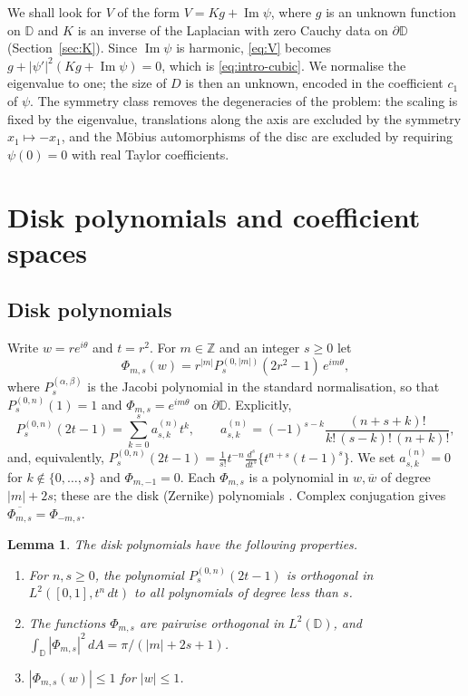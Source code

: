 \documentclass[11pt]{amsart}
\newtheorem{lemma}[theorem]{Lemma}
\theoremstyle{definition}
\theoremstyle{remark}
\numberwithin{equation}{section}
\newcommand{\Z}{\mathbb{Z}}
\newcommand{\D}{\mathbb{D}}
\newcommand{\bw}{\overline{w}}
\DeclareMathOperator{\im}{Im}
\begin{document}
We shall look for $V$ of the form $V=Kg+\im\psi$, where $g$ is an unknown function on $\D$ and $K$ is an inverse of the Laplacian with zero Cauchy data on $\partial\D$ (Section~\ref{sec:K}). Since $\im\psi$ is harmonic, \eqref{eq:V} becomes $g+|\psi'|^2(Kg+\im\psi)=0$, which is \eqref{eq:intro-cubic}. We normalise the eigenvalue to one; the size of $D$ is then an unknown, encoded in the coefficient $c_1$ of $\psi$. The symmetry class removes the degeneracies of the problem: the scaling is fixed by the eigenvalue, translations along the axis are excluded by the symmetry $x_1\mapsto-x_1$, and the M\"obius automorphisms of the disc are excluded by requiring $\psi(0)=0$ with real Taylor coefficients.

\section{Disk polynomials and coefficient spaces}\label{sec:disk}

\subsection{Disk polynomials}
Write $w=re^{i\theta}$ and $t=r^2$. For $m\in\Z$ and an integer $s\geq0$ let
\begin{equation}\label{eq:Phi}
\Phi_{m,s}(w)=r^{|m|}P_s^{(0,|m|)}(2r^2-1)\,e^{im\theta},
\end{equation}
where $P^{(\alpha,\beta)}_s$ is the Jacobi polynomial in the standard normalisation, so that $P^{(0,n)}_s(1)=1$ and $\Phi_{m,s}=e^{im\theta}$ on $\partial\D$. Explicitly,
\begin{equation}\label{eq:jacobi}
P_s^{(0,n)}(2t-1)=\sum_{k=0}^sa^{(n)}_{s,k}t^k,\qquad a^{(n)}_{s,k}=(-1)^{s-k}\frac{(n+s+k)!}{k!\,(s-k)!\,(n+k)!},
\end{equation}
and, equivalently, $P_s^{(0,n)}(2t-1)=\frac1{s!}t^{-n}\frac{d^s}{dt^s}\{t^{n+s}(t-1)^s\}$. We set $a^{(n)}_{s,k}=0$ for $k\notin\{0,\ldots,s\}$ and $\Phi_{m,-1}=0$. Each $\Phi_{m,s}$ is a polynomial in $w,\bw$ of degree $|m|+2s$; these are the disk (Zernike) polynomials \cite{Koo78}. Complex conjugation gives $\overline{\Phi_{m,s}}=\Phi_{-m,s}$.

\begin{lemma}\label{lem:orth}
The disk polynomials have the following properties.
\begin{enumerate}[label=\textup{(\alph*)}]
\item For $n,s\geq0$, the polynomial $P^{(0,n)}_s(2t-1)$ is orthogonal in $L^2([0,1],t^n\,dt)$ to all polynomials of degree less than $s$.
\item The functions $\Phi_{m,s}$ are pairwise orthogonal in $L^2(\D)$, and $\int_\D|\Phi_{m,s}|^2\,dA=\pi/(|m|+2s+1)$.
\item $|\Phi_{m,s}(w)|\leq1$ for $|w|\leq1$.
\end{enumerate}
\end{lemma}
\end{document}
